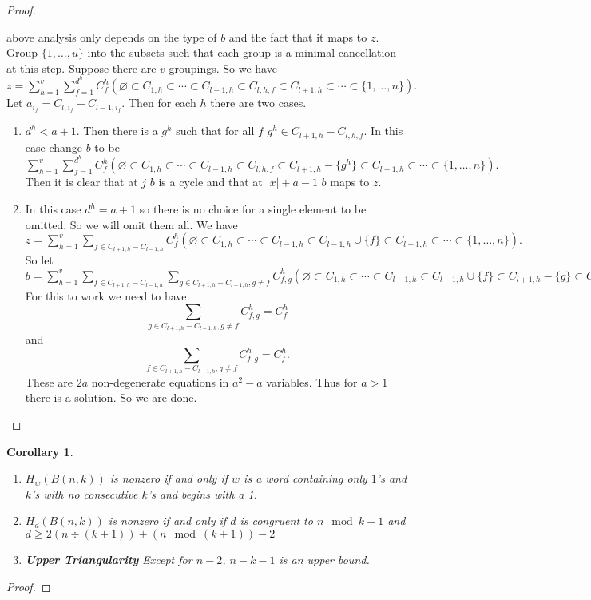 \documentclass{article}
\newtheorem{corollary}[theorem]{Corollary}
\begin{document}
\begin{proof}
\begin{enumerate}
        above analysis only depends on the type of $b$ and the fact that it maps to $z$. 
        Group $\{1, \ldots, u
        \}$ into the subsets such that each group is a minimal cancellation at this step. Suppose there are $v$ groupings. 
        So we have
	  $z = \sum_{h=1}^v \sum_{f=1}^{d^h} C^h_f (\varnothing \subset C_{1, h} \subset \cdots \subset C_{l-1, h} \subset
	  C_{l, h, f} \subset C_{l+1, h} \subset \cdots \subset \{1, \ldots, n\}).$ Let $a_{i_f} = 
	  C_{l, i_f} - C_{l-1, i_f}$. Then for each $h$ there are two cases.
	  \begin{enumerate}
 	  \item $d^h < a+1$. Then there is a $g^h$ such that for all $f$ $g^h \in C_{l+1, h} - C_{l, h, f}$. In this case 
	    change
	    $b$ to be $\sum_{h=1}^v \sum_{f=1}^{d^h} C^h_f (\varnothing \subset C_{1, h} \subset \cdots \subset C_{l-1, h} 
	    \subset C_{l, h, f} \subset C_{l+1, h} - \{g^h\} \subset C_{l+1, h} \subset \cdots \subset \{1, \ldots, n\}).$ 
	    Then it is clear that at $j$ $b$ is a cycle and that at $|x|+a-1$ $b$ maps to $z$. 
 	  \item In this case $d^h = a+1$ so there is no choice for a single element to be omitted. So we will omit them all.
	    We have 
	    $z = \sum_{h=1}^v \sum_{f \in C_{l+1, h} - C_{l-1, h}} C^h_f (\varnothing \subset C_{1, h} \subset \cdots 
	    \subset C_{l-1, h} \subset
	    C_{l-1, h} \cup \{f\} \subset C_{l+1, h} \subset \cdots \subset \{1, \ldots, n\}).$ So let 
          $b = \sum_{h=1}^v \sum_{f \in C_{l+1, h} - C_{l-1, h}} \sum_{g \in C_{l+1, h} - C_{l-1, h}, g \ne f}
          C^h_{f, g} (\varnothing \subset C_{1, h} \subset \cdots 
	    \subset C_{l-1, h} \subset
	    C_{l-1, h} \cup \{f\} \subset C_{l+1, h} - \{g\}\subset C_{l+1, h} \subset \cdots \subset \{1, \ldots, n\}).$ For 
	    this to work we need to have $$\sum_{g \in C_{l+1, h} - C_{l-1, h}, g \ne f} C^h_{f, g} = C^h_f$$ and 
	    $$\sum_{f \in C_{l+1, h} - C_{l-1, h}, g \ne f} C^h_{f, g} = C^h_f.$$ These are $2a$ non-degenerate equations in 
	    $a^2-a$ variables. Thus for $a>1$ there is a solution. So we are done.

	  \end{enumerate}   
    \end{enumerate}
  \end{proof}

  \begin{corollary}


    \begin{enumerate}
      \item $H_w(B(n, k))$ is nonzero if and only if $w$ is a word containing only $1$'s and $k$'s with 
        no consecutive $k$'s and begins with a 1.
      \item $H_d(B(n, k))$ is nonzero if and only if $d$ is congruent to $n \mod k-1$ and $d \ge 2(n \div (k+1)) + (n \mod
        (k+1)) - 2$
      \item {\bf Upper Triangularity} Except for $n-2$, $n-k-1$ is an upper bound.
    \end{enumerate}
  \end{corollary}
  \begin{proof}
  \end{proof}  
\end{document}
